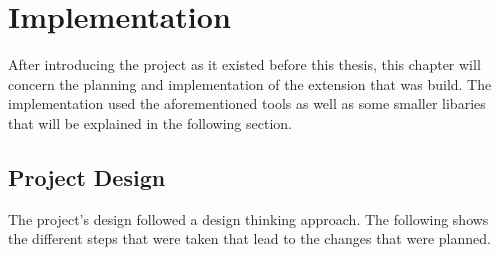 
\chapter{Implementation} %
\label{Chapter4} %

After introducing the project as it existed before this thesis,
this chapter will concern the planning and implementation of the extension that was build.
The implementation used the aforementioned tools as well as some smaller libaries that will be explained in the following section.

\section{Project Design}
The project's design followed a design thinking approach.
The following shows the different steps that were taken that lead to the changes that were planned.

